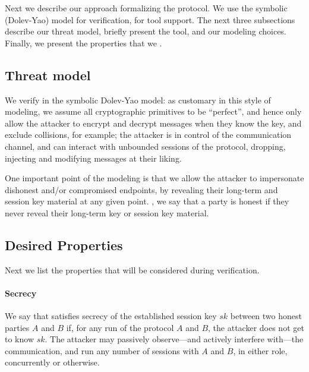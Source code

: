 
Next we describe our approach  formalizing the \mEdhoc{} protocol. We use the
symbolic (Dolev-Yao) model for verification,  \mTamarin{} for tool support.
%
The next three subsections describe our threat model, briefly present the
\mTamarin{} tool, and our modeling choices.
%
Finally, we present the properties that we .

\subsection{Threat model}\label{sec:threat-model}
We verify \mEdhoc{} in the symbolic Dolev-Yao model: as customary in this style of
modeling, we assume all cryptographic primitives to be ``perfect'', and hence
only allow the attacker to encrypt and decrypt messages when they know the key,
and exclude  collisions, for example; the attacker is  in control of the
communication channel, and can interact with unbounded sessions of the protocol,
dropping, injecting and modifying messages at their liking.

One important point of the modeling is that we allow the attacker to impersonate
dishonest and/or compromised endpoints, by revealing their long-term and session
key material at any given point.
%
, we say that a party is honest if they never reveal their
long-term key or session key material.

\subsection{Desired Properties}
\label{sec:desired-properties}
Next we list the properties that will be considered during verification.

\paragraph{Secrecy}
We say that  \mEdhoc{} satisfies secrecy of the established session key $sk$
between two honest parties $A$ and $B$ if, for any run of the protocol $A$ and
$B$, the attacker does not get to know $sk$.
%
The attacker may passively observe---and actively interfere with---the
communication, and run any number of sessions with $A$ and $B$, in either role,
concurrently or otherwise.

